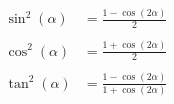 \begin{equation}
\begin{split}
    \sin^2(\alpha) &= \frac{1 - \cos(2\alpha)}{2} \\
    &\\
    \cos^2(\alpha) &= \frac{1 + \cos(2\alpha)}{2} \\
    &\\
    \tan^2(\alpha) &= \frac{1 - \cos(2\alpha)}{1 + \cos(2\alpha)}
\end{split}
\end{equation}